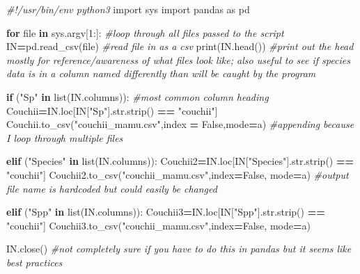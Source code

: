 \documentclass[
]{article}
\newenvironment{Shaded}{\begin{snugshade}}{\end{snugshade}}
\newcommand{\BuiltInTok}[1]{#1}
\newcommand{\CommentTok}[1]{\textcolor[rgb]{0.56,0.35,0.01}{\textit{#1}}}
\newcommand{\ControlFlowTok}[1]{\textcolor[rgb]{0.13,0.29,0.53}{\textbf{#1}}}
\newcommand{\DecValTok}[1]{\textcolor[rgb]{0.00,0.00,0.81}{#1}}
\newcommand{\ImportTok}[1]{#1}
\newcommand{\KeywordTok}[1]{\textcolor[rgb]{0.13,0.29,0.53}{\textbf{#1}}}
\newcommand{\NormalTok}[1]{#1}
\newcommand{\OperatorTok}[1]{\textcolor[rgb]{0.81,0.36,0.00}{\textbf{#1}}}
\newcommand{\StringTok}[1]{\textcolor[rgb]{0.31,0.60,0.02}{#1}}
\newcommand{\VariableTok}[1]{\textcolor[rgb]{0.00,0.00,0.00}{#1}}
\begin{document}
\begin{Shaded}
\begin{Highlighting}[]
\CommentTok{\#!/usr/bin/env python3}
\ImportTok{import}\NormalTok{ sys}
\ImportTok{import}\NormalTok{ pandas }\ImportTok{as}\NormalTok{ pd}

\ControlFlowTok{for} \BuiltInTok{file} \KeywordTok{in}\NormalTok{ sys.argv[}\DecValTok{1}\NormalTok{:]:  }\CommentTok{\#loop through all files passed to the script}
\NormalTok{  IN}\OperatorTok{=}\NormalTok{pd.read\_csv(}\BuiltInTok{file}\NormalTok{)    }\CommentTok{\#read file in as a csv}
  \BuiltInTok{print}\NormalTok{(IN.head())        }\CommentTok{\#print out the head mostly for reference/awareness of what files look like; also useful to see if species data is in a column named differently than will be caught by the program}
                          
  \ControlFlowTok{if}\NormalTok{ (}\StringTok{"Sp"} \KeywordTok{in} \BuiltInTok{list}\NormalTok{(IN.columns)): }\CommentTok{\#most common column heading}
\NormalTok{      Couchii}\OperatorTok{=}\NormalTok{IN.loc[IN[}\StringTok{"Sp"}\NormalTok{].}\BuiltInTok{str}\NormalTok{.strip() }\OperatorTok{==} \StringTok{"couchii"}\NormalTok{]}
\NormalTok{      Couchii.to\_csv(}\StringTok{"couchii\_mamu.csv"}\NormalTok{,index }\OperatorTok{=} \VariableTok{False}\NormalTok{,mode}\OperatorTok{=}\StringTok{\textquotesingle{}a\textquotesingle{}}\NormalTok{) }\CommentTok{\#appending because I loop through multiple files}
  
  \ControlFlowTok{elif}\NormalTok{ (}\StringTok{"Species"} \KeywordTok{in} \BuiltInTok{list}\NormalTok{(IN.columns)):}
\NormalTok{      Couchii2}\OperatorTok{=}\NormalTok{IN.loc[IN[}\StringTok{"Species"}\NormalTok{].}\BuiltInTok{str}\NormalTok{.strip() }\OperatorTok{==} \StringTok{"couchii"}\NormalTok{]}
\NormalTok{      Couchii2.to\_csv(}\StringTok{"couchii\_mamu.csv"}\NormalTok{,index}\OperatorTok{=}\VariableTok{False}\NormalTok{, mode}\OperatorTok{=}\StringTok{\textquotesingle{}a\textquotesingle{}}\NormalTok{) }\CommentTok{\#output file name is hardcoded but could easily be changed}
  
  \ControlFlowTok{elif}\NormalTok{ (}\StringTok{"Spp"} \KeywordTok{in} \BuiltInTok{list}\NormalTok{(IN.columns)):}
\NormalTok{      Couchii3}\OperatorTok{=}\NormalTok{IN.loc[IN[}\StringTok{"Spp"}\NormalTok{].}\BuiltInTok{str}\NormalTok{.strip() }\OperatorTok{==} \StringTok{"couchii"}\NormalTok{]}
\NormalTok{      Couchii3.to\_csv(}\StringTok{"couchii\_mamu.csv"}\NormalTok{,index}\OperatorTok{=}\VariableTok{False}\NormalTok{, mode}\OperatorTok{=}\StringTok{\textquotesingle{}a\textquotesingle{}}\NormalTok{)}
  
\NormalTok{  IN.close() }\CommentTok{\#not completely sure if you have to do this in pandas but it seems like best practices}
\end{Highlighting}
\end{Shaded}
\end{document}

